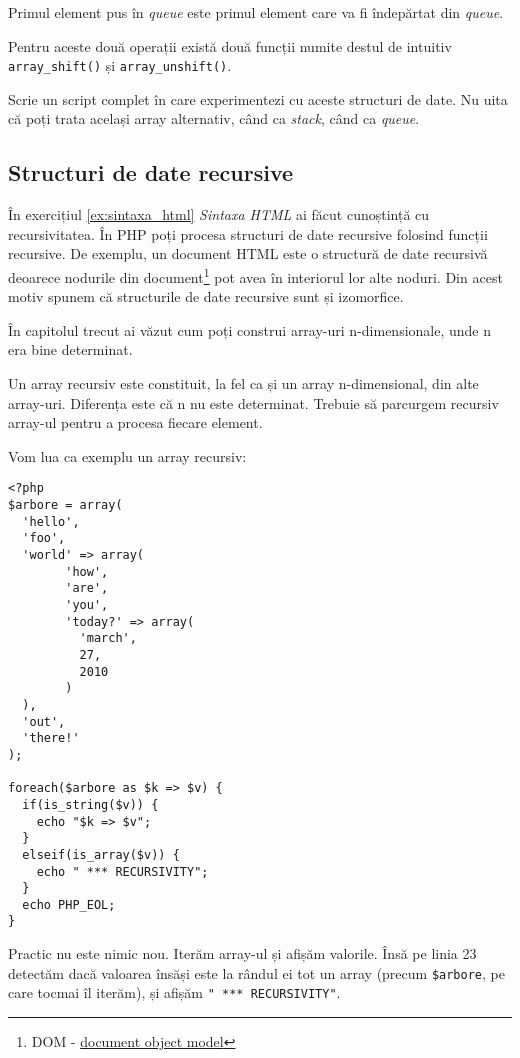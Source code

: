 Primul element pus în \textit{queue} este primul
element care va fi îndepărtat din \textsl{queue}.

Pentru aceste două operații există două funcții numite
destul de intuitiv \texttt{array\_shift()} și
\texttt{array\_unshift()}.



\begin{Exercise}[title={Experimentează cu stack și queue}]
Scrie un script complet în care experimentezi cu
aceste structuri de date. Nu uita că poți trata
același array alternativ, când ca \textit{stack}, când ca \textit{queue}.
\end{Exercise}

\subsection{Structuri de date recursive}
În exercițiul \ref{ex:sintaxa_html} \textit{Sintaxa HTML} ai
făcut cunoștință cu recursivitatea. În PHP poți procesa
structuri de date recursive folosind funcții recursive.
De exemplu,
un document HTML este o structură de date recursivă
deoarece nodurile din
document\footnote{DOM - \href{http://en.wikipedia.org/wiki/Document_Object_Model}{document object model}}
pot avea în interiorul lor alte noduri. Din acest motiv
spunem că structurile de date recursive sunt și izomorfice.

În capitolul trecut ai văzut cum poți construi array-uri
n-dimensionale, unde n era bine determinat.

Un array recursiv este constituit, la fel ca și un array
n-dimensional, din alte array-uri. Diferența este că
n nu este determinat. Trebuie să parcurgem recursiv
array-ul pentru a procesa fiecare element.


Vom lua ca exemplu un array recursiv:
\begin{lstlisting}
<?php
$arbore = array(
  'hello',
  'foo',
  'world' => array(
        'how',
        'are',
        'you',
        'today?' => array(
          'march',
          27,
          2010
        )
  ),
  'out',
  'there!'
);

foreach($arbore as $k => $v) {
  if(is_string($v)) {
	echo "$k => $v";
  }
  elseif(is_array($v)) {
	echo " *** RECURSIVITY";
  }
  echo PHP_EOL;
}
\end{lstlisting}
Practic nu este nimic nou. Iterăm array-ul și afișăm
valorile. Însă pe linia 23 detectăm dacă valoarea însăși
este la rândul ei tot un array (precum \texttt{\$arbore},
pe care tocmai îl iterăm), și afișăm \texttt{" *** RECURSIVITY"}.

